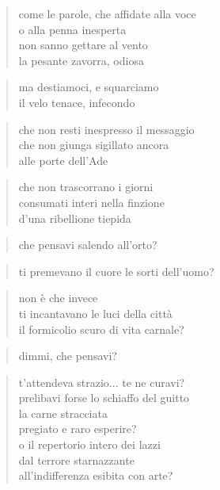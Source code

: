 \begin{verse}
    come le parole, che affidate alla voce\\
    o alla penna inesperta\\
    non sanno gettare al vento\\
    la pesante zavorra, odiosa
\end{verse}

\begin{verse}
    ma destiamoci, e squarciamo\\
    il velo tenace, infecondo
\end{verse}

\begin{verse}
    che non resti inespresso il messaggio\\
    che non giunga sigillato ancora\\
    alle porte dell'Ade
\end{verse}

\begin{verse}
    che non trascorrano i giorni\\
    consumati interi nella finzione\\
    d'una ribellione tiepida
\end{verse}

\clearpage


\begin{verse}
    che pensavi salendo all'orto?
\end{verse}

\begin{verse}
    ti premevano il cuore le sorti dell'uomo?
\end{verse}

\begin{verse}
    non è che invece\\
    ti incantavano le luci della città\\
    il formicolio scuro di vita carnale?
\end{verse}

\begin{verse}
    dimmi, che pensavi?
\end{verse}

\begin{verse}
    t'attendeva strazio... te ne curavi?\\
    prelibavi forse lo schiaffo del guitto\\
    la carne stracciata\\
    pregiato e raro esperire?\\
    o il repertorio intero dei lazzi\\
    dal terrore starnazzante\\
    all'indifferenza esibita con arte?
\end{verse}

